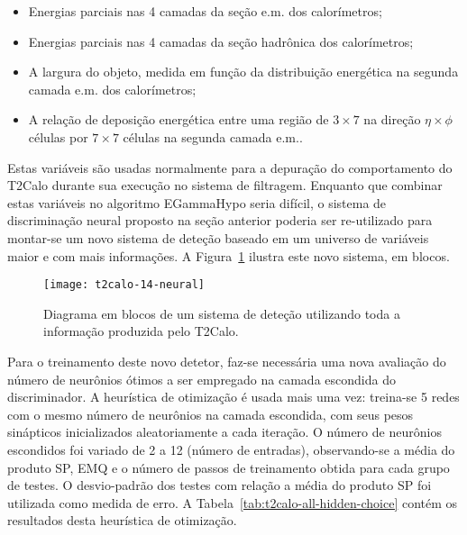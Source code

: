 \begin{itemize}
\item Energias parciais nas 4 camadas da seção e.m. dos calorímetros;
\item Energias parciais nas 4 camadas da seção hadrônica dos calorímetros;
\item A largura do objeto, medida em função da distribuição energética na
segunda camada e.m. dos calorímetros;
\item A relação de deposição energética entre uma região de $3\times7$ na
direção $\eta\times\phi$ células por $7\times7$ células na segunda camada e.m..
\end{itemize}

Estas variáveis são usadas normalmente  para a depuração do
comportamento do T2Calo durante sua execução no sistema de filtragem. Enquanto
que combinar estas variáveis no algoritmo EGammaHypo seria difícil, o sistema
de discriminação neural proposto na seção anterior poderia ser re-utilizado
para montar-se um novo sistema de deteção baseado em um universo de variáveis
maior e com mais informações. A Figura~\ref{fig:t2calo-14-neural} ilustra este
novo sistema, em blocos.

\begin{figure}
\begin{center}
\texttt{[image: t2calo-14-neural]}
\end{center}
\caption{Diagrama em blocos de um sistema de deteção utilizando toda a
informação produzida pelo T2Calo.}
\label{fig:t2calo-14-neural}
\end{figure}

Para o treinamento deste novo detetor, faz-se necessária uma nova avaliação do
número de neurônios ótimos a ser empregado na camada escondida do
discriminador. A heurística de otimização é usada mais uma vez: treina-se 5
redes com o mesmo número de neurônios na camada escondida, com seus pesos
sinápticos inicializados aleatoriamente a cada iteração. O número de neurônios
escondidos foi variado de 2 a 12 (número de entradas), observando-se a média
do produto SP, EMQ e o número de passos de treinamento obtida para cada grupo
de testes. O desvio-padrão dos testes com relação a média do produto SP foi
utilizada como medida de erro. A Tabela~\ref{tab:t2calo-all-hidden-choice}
contém os resultados desta heurística de otimização.

